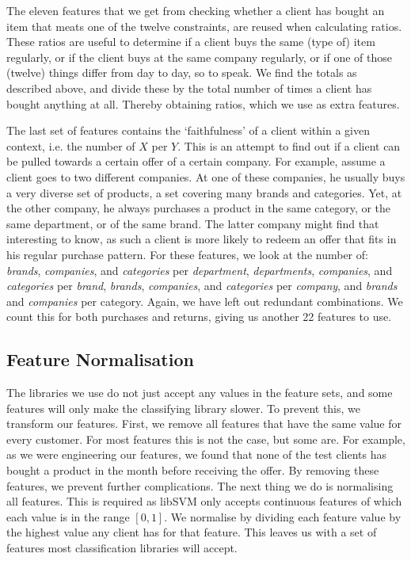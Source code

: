 \documentclass[a4paper]{article}
\begin{document}
The eleven features that we get from checking whether a client has bought an item that meats one of the twelve constraints, are reused when calculating ratios. These ratios are useful to determine if a client buys the same (type of) item regularly, or if the client buys at the same company regularly, or if one of those (twelve) things differ from day to day, so to speak. We find the totals as described above, and divide these by the total number of times a client has bought anything at all. Thereby obtaining ratios, which we use as extra features.

The last set of features contains the `faithfulness' of a client within a given context, i.e. the number of $X$ per $Y$. This is an attempt to find out if a client can be pulled towards a certain offer of a certain company. For example, assume a client goes to two different companies. At one of these companies, he usually buys a very diverse set of products, a set covering many brands and categories. Yet, at the other company, he always purchases a product in the same category, or the same department, or of the same brand. The latter company might find that interesting to know, as such a client is more likely to redeem an offer that fits in his regular purchase pattern. For these features, we look at the number of: \emph{brands}, \emph{companies}, and \emph{categories} per \emph{department}, \emph{departments}, \emph{companies}, and \emph{categories} per \emph{brand}, \emph{brands}, \emph{companies}, and \emph{categories} per \emph{company}, and \emph{brands} and \emph{companies} per category. Again, we have left out redundant combinations. We count this for both purchases and returns, giving us another 22 features to use. 

\subsection{Feature Normalisation}
The libraries we use do not just accept any values in the feature sets, and some features will only make the classifying library slower. To prevent this, we transform our features. First, we remove all features that have the same value for every customer. For most features this is not the case, but some are. For example, as we were engineering our features, we found that none of the test clients has bought a product in the month before receiving the offer. By removing these features, we prevent further complications. The next thing we do is normalising all features. This is required as libSVM only accepts continuous features of which each value is in the range $[0,1]$. We normalise by dividing each feature value by the highest value any client has for that feature. This leaves us with a set of features most classification libraries will accept.
\end{document}
